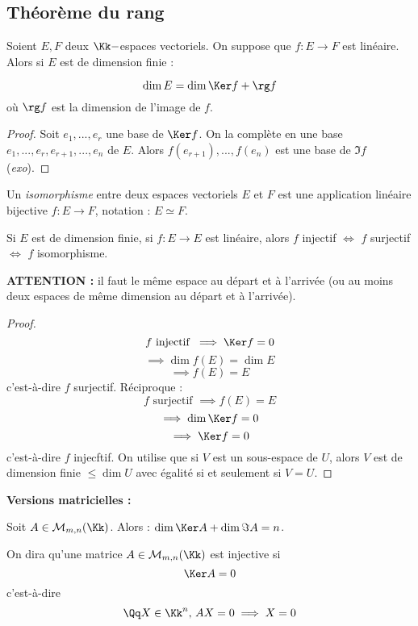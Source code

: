 \documentclass[class=report,crop=false]{standalone}
\newcommand{\iso}{\simeq}
\begin{document}
\subsection{Théorème du rang}

\begin{theoreme}
Soient $E,F$ deux $\Kk-$espaces vectoriels. On suppose que $f : E \to F$ est linéaire. Alors si $E$ est de dimension finie :

\[\dim E = \dim \Ker f + \rg f\]
où $\rg f$ est la dimension de l'image de $f$. 
\end{theoreme}

\begin{proof}
Soit $e_1,...,e_r$ une base de $\Ker f$. On la complète en une base $e_1,...,e_r,e_{r+1},...,e_n$ de $E$. Alors $f(e_{r+1}),...,f(e_n)$ est une base de $\Im f$ ({\it exo}).
\end{proof}


\begin{definition}
Un {\it isomorphisme} entre deux espaces vectoriels $E$ et $F$ est une application linéaire bijective $f : E \to F$, notation : $E \iso F$.
\end{definition}

\begin{corollaire}
Si $E$ est de dimension finie, si $f : E \to E$ est linéaire, alors $f$ injectif $\iff$ $f$ surjectif $\iff$ $ f$ isomorphisme.
\end{corollaire}
\begin{remarque*}
{\bf ATTENTION : } il faut le même espace au départ et à l'arrivée (ou au moins deux espaces de même dimension au départ et à l'arrivée).
\end{remarque*}

\begin{proof}

\[f \mbox{ injectif } \implies \Ker f = 0\]
\[\implies \dim f(E) = \dim E\]
\[\implies f(E) = E \]
c'est-à-dire $f$ surjectif. Réciproque :
\[f \mbox{ surjectif } \implies f(E) = E\]
\[\implies \dim \Ker f = 0\]
\[\implies \Ker f = 0\]
c'est-à-dire $f$ injecftif.
On utilise que si $V$ est un sous-espace de $U$, alors $V$ est de dimension finie $\le \dim U$ avec égalité si et seulement si $V =U$.
\end{proof}

{\bf Versions matricielles : }

Soit $A \in \mathcal{M}_{m,n}(\Kk)$. Alors : $\dim \Ker A + \dim \Im A = n$. 

On dira qu'une matrice $A \in \mathcal{M}_{m,n}(\Kk)$ est injective si 
\[\Ker A = 0\]
c'est-à-dire \[\Qq X \in \Kk^n,\, AX = 0 \implies X =0\]
\end{document}
